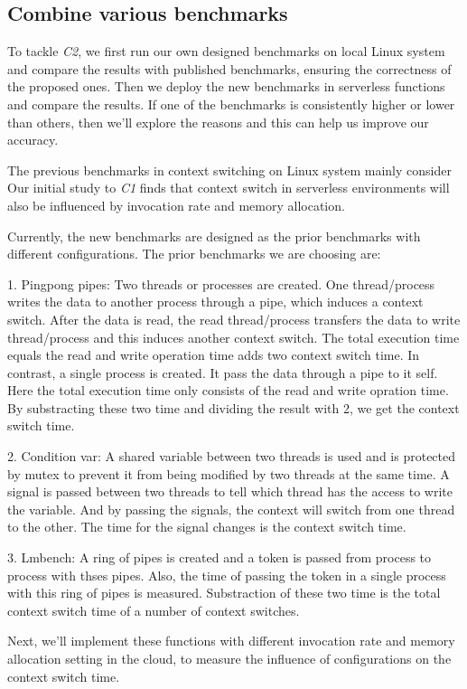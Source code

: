 \subsection{Combine various benchmarks}
	To tackle \emph{C2}, we first run our own designed benchmarks on local Linux system and compare the results with published benchmarks\cite{cs-lmbench,cs-pipes,cs-arm,cs-web},
	 ensuring the correctness of the proposed ones. Then we deploy the new benchmarks in serverless functions and compare the results. 
	 If one of the benchmarks is consistently higher or lower than others, then we'll explore the reasons and this can help us improve our accuracy.

	The previous benchmarks in context switching on Linux system mainly consider %
	Our initial study to \emph{C1} finds that context switch in serverless environments will also be influenced by invocation rate and memory allocation.   

	Currently, the new benchmarks are designed as the prior benchmarks with different configurations.
	The prior benchmarks we are choosing are:
	
	1. Pingpong pipes\cite{cs-pipes,cs-web}: Two threads or processes are created. 
		      One thread/process writes the data to another process through a pipe, which induces a context switch. 
			  After the data is read, the read thread/process transfers the data to write thread/process and this induces another context switch.
			  The total execution time equals the read and write operation time adds two context switch time.
			  In contrast, a single process is created. It pass the data through a pipe to it self. 
			  Here the total execution time only consists of the read and write opration time.
			  By substracting these two time and dividing the result with 2, we get the context switch time.
	
	2. Condition var\cite{cs-web}: A shared variable between two threads is used and is protected by mutex to prevent it from being modified by two threads at the same time.
		      A signal is passed between two threads to tell which thread has the access to write the variable.
			  And by passing the signals, the context will switch from one thread to the other. 
			  The time for the signal changes is the context switch time.
	
	3.  Lmbench\cite{cs-lmbench}: A ring of pipes is created and a token is passed from process to process with thses pipes. 
	          Also, the time of passing the token in a single process with this ring of pipes is measured. 
			  Substraction of these two time is the total context switch time of a number of context switches.

	Next, we'll implement these functions with different invocation rate and memory allocation setting in the cloud,
	to measure the influence of configurations on the context switch time.

